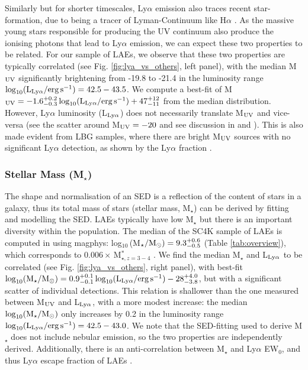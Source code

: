 \documentclass[a4paper,fleqn,usenatbib]{mnras}
\begin{document}
Similarly but for shorter timescales, Ly$\alpha$ emission also traces recent star-formation, due to being a tracer of Lyman-Continuum \citep[e.g.][]{SobralMatthee2019} like H$\alpha$ \citep[][]{Kennicutt1998}. As the massive young stars responsible for producing the UV continuum also produce the ionising photons that lead to Ly$\alpha$ emission, we can expect these two properties to be related. For our sample of LAEs, we observe that these two properties are typically correlated (see Fig. \ref{fig:lya_vs_others}, left panel), with the median M$_{\rm UV}$ significantly brightening from -19.8 to -21.4 in the luminosity range $\log_{10} (\rm L_{Ly\alpha}/erg\,s^{-1})=42.5-43.5$. We compute a best-fit of M$_{\rm UV}=-1.6_{-0.3}^{+0.2}\log_{10} (\rm L_{Ly\alpha}/erg\,s^{-1})+47_{-11}^{+12}$ from the median distribution. However, Ly$\alpha$ luminosity (L$_{\rm Ly\alpha}$) does not necessarily translate M$_{\rm UV}$ and vice-versa (see the scatter around M$_{\rm UV}=-20$ and see discussion in \citealt{Matthee2017spectra} and \citealt{Sobral2018Spectra}). This is also made evident from LBG samples, where there are bright M$_{\rm UV}$ sources with no significant Ly$\alpha$ detection, as shown by the Ly$\alpha$ fraction \citep[e.g.][]{Stark2010,Pentericci2011,Arrabal2018,Kusakabe2020}.

\subsubsection{Stellar Mass {\rm (M$_\star$)}} \label{subsec:mstar}

The shape and normalisation of an SED is a reflection of the content of stars in a galaxy, thus its total mass of stars (stellar mass, M$_\star$) can be derived by fitting and modelling the SED. LAEs typically have low M$_\star$ but there is an important diversity within the population. The median of the SC4K sample of LAEs is computed in \cite{Santos2020} using {\sc magphys}: log$_{10}\,$(M$\rm_\star/M_{\odot})=9.3^{+0.6}_{-0.5}$ (Table \ref{tab:overview}), which corresponds to $0.006\times$\,M$_{\star,z=3-4}^*$ \citep{Muzzin2013}. We find the median M$_\star$ and L$_{\rm Ly\alpha}$ to be correlated (see Fig. \ref{fig:lya_vs_others}, right panel), with best-fit $\log_{10} (\rm M_\star/M_\odot)=0.9_{-0.1}^{+0.1}\log_{10} (\rm L_{Ly\alpha}/erg\,s^{-1})-28_{-3.8}^{+4.0}$, but with a significant scatter of individual detections. This relation is shallower than the one measured between M$_{\rm UV}$ and L$_{\rm Ly\alpha}$, with a more modest increase: the median $\log_{10} (\rm M_\star/M_\odot)$ only increases by 0.2 in the luminosity range $\log_{10} (\rm L_{Ly\alpha}/erg\,s^{-1})=42.5-43.0$. We note that the SED-fitting used to derive M$_\star$ does not include nebular emission, so the two properties are independently derived. Additionally, there is an anti-correlation between M$_\star$ and Ly$\alpha$ EW$_0$, and thus Ly$\alpha$ escape fraction of LAEs \citep{Santos2020}.
\end{document}
